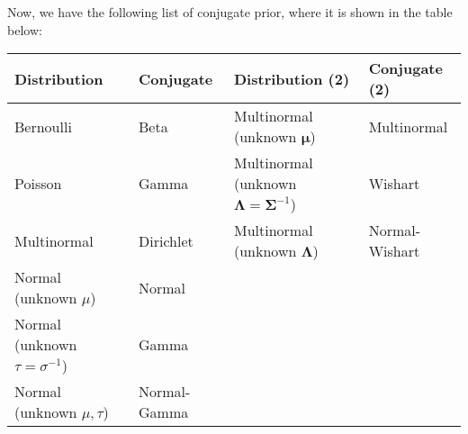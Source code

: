 \begin{remark}
    Now, we have the following list of conjugate prior, where it is shown in the table below:
    \begin{table}[H]
    \centering
    \begin{tabular}{llll}
        \toprule
        \textbf{Distribution}  & \textbf{Conjugate} & \textbf{Distribution (2)}  & \textbf{Conjugate (2)} \\
        \midrule
        Bernoulli & Beta & Multinormal (unknown $\boldsymbol \mu$) & Multinormal \\
        Poisson & Gamma & Multinormal (unknown $\boldsymbol \Lambda = \boldsymbol\Sigma^{-1}$) & Wishart \\
        Multinormal & Dirichlet & Multinormal (unknown $\boldsymbol \Lambda$) & Normal-Wishart \\
        Normal (unknown $\mu$) & Normal  \\
        Normal (unknown $\tau = \sigma^{-1}$) & Gamma \\
        Normal (unknown $\mu, \tau$) & Normal-Gamma \\
        \bottomrule
    \end{tabular}
    \end{table}    
\end{remark}

